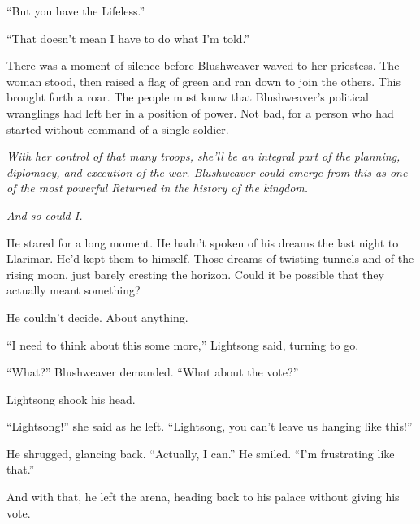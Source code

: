 “But you have the Lifeless.”

“That doesn’t mean I have to do what I’m told.”

There was a moment of silence before Blushweaver waved to her priestess. The woman stood, then raised a flag of green and ran down to join the others. This brought forth a roar. The people must know that Blushweaver’s political wranglings had left her in a position of power. Not bad, for a person who had started without command of a single soldier.

\textit{With her control of that many troops, she’ll be an integral part of the planning, diplomacy, and execution of the war. Blushweaver could emerge from this as one of the most powerful Returned in the history of the kingdom.}

\textit{And so could I.}

He stared for a long moment. He hadn’t spoken of his dreams the last night to Llarimar. He’d kept them to himself. Those dreams of twisting tunnels and of the rising moon, just barely cresting the horizon. Could it be possible that they actually meant something?

He couldn’t decide. About anything.

“I need to think about this some more,” Lightsong said, turning to go.

“What?” Blushweaver demanded. “What about the vote?”

Lightsong shook his head.

“Lightsong!” she said as he left. “Lightsong, you can’t leave us hanging like this!”

He shrugged, glancing back. “Actually, I can.” He smiled. “I’m frustrating like that.”

And with that, he left the arena, heading back to his palace without giving his vote.

